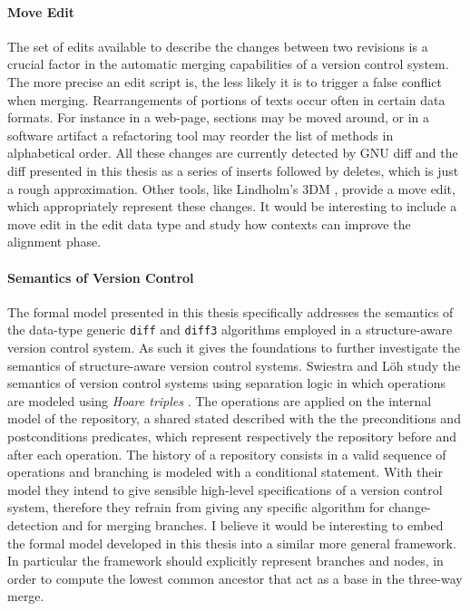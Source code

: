 \documentclass[../Thesis.tex]{subfiles}
\begin{document}
\paragraph{Move Edit}
The set of edits available to describe the changes between two revisions
is a crucial factor in the automatic merging capabilities of a 
version control system. The more precise an edit script is, the less likely
it is to trigger a false conflict when merging.
Rearrangements of portions of texts occur often in certain data formats.
For instance in a web-page, sections may be moved around, or 
in a software artifact a refactoring tool may reorder the list of methods in 
alphabetical order. All these changes are currently detected by GNU diff
and the diff presented in this thesis as a series of inserts followed by deletes, which is just a rough approximation.
Other tools, like Lindholm's 3DM \cite{Lind04}, provide a move edit, which
appropriately represent these changes.
It would be interesting to include a move edit in the edit data type and
study how contexts \cite{Zipper, Derivative} can improve the 
alignment phase.

\paragraph{Semantics of Version Control}
The formal model presented in this thesis specifically addresses
the semantics of the data-type generic \texttt{diff} and \texttt{diff3} algorithms employed in a structure-aware version control system.
As such it gives the foundations to further investigate the semantics of structure-aware version control systems. Swiestra and L\"oh study the
semantics of version control systems using separation logic  in which operations are modeled using \emph{Hoare triples} 
\cite{SemanticsOfVersionControl}.
The operations are applied on the internal model of the repository, a shared stated described with the the preconditions and postconditions predicates, which represent respectively the repository before and after each operation.
The history of a repository consists in a valid sequence of operations and branching is modeled with a conditional statement.
With their model they intend to give sensible high-level specifications of a version control system, therefore they refrain from giving any 
specific algorithm for change-detection and for merging branches.
I believe it would be interesting to embed the formal model developed
in this thesis into a similar more general framework. In particular
the framework should explicitly represent branches and nodes, in order to 
compute the lowest common ancestor that act as a base in the three-way merge.
\end{document}
